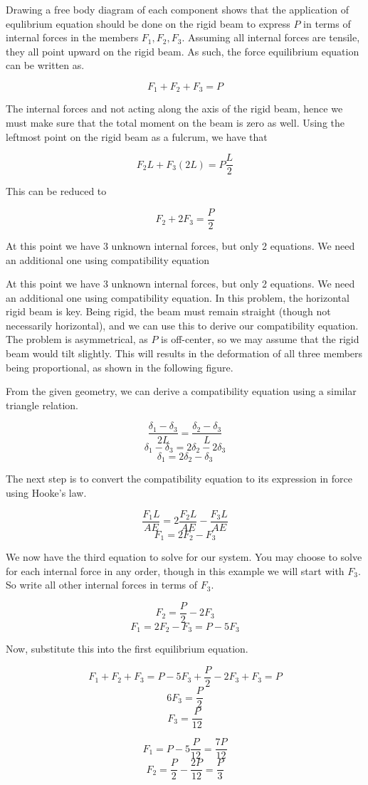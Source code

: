 \documentclass[
10pt,
a4paper,
openany,
svgnames,
]{kaobook} %
\begin{document}
\begin{solution}

  Drawing a free body diagram of each component shows that the application of equlibrium equation should be done on the rigid beam to express $P$ in terms of internal forces in the members $F_1, F_2, F_3$. Assuming all internal forces are tensile, they all point upward on the rigid beam. As such, the force equilibrium equation can be written as.

 \[ F_1 + F_2 + F_3 = P \]

 The internal forces and not acting along the axis of the rigid beam, hence we must make sure that the total moment on the beam is zero as well. Using the leftmost point on the rigid beam as a fulcrum, we have that

 $$ F_2 L + F_3 (2L) = P \frac{L}{2} $$

 This can be reduced to 

 $$ F_2 + 2F_3 = \frac{P}{2} $$

 At this point we have 3 unknown internal forces, but only 2 equations. We need an additional one using compatibility equation

 At this point we have 3 unknown internal forces, but only 2 equations. We need an additional one using compatibility equation. In this problem, the horizontal rigid beam is key. Being rigid, the beam must remain straight (though not necessarily horizontal), and we can use this to derive our compatibility equation. The problem is asymmetrical, as $P$ is off-center, so we may assume that the rigid beam would tilt slightly. This will results in the deformation of all three members being proportional, as shown in the following figure.


 From the given geometry, we can derive a compatibility equation using a similar triangle relation.

 $$ \frac{\delta_1 - \delta_3}{2L} = \frac{\delta_2 - \delta_3}{L} $$
 $$ \delta_1 - \delta_3 = 2\delta_2 - 2\delta_3 $$
 $$ \delta_1 = 2\delta_2 - \delta_3 $$

 The next step is to convert the compatibility equation to its expression in force using Hooke's law.

 $$ \frac{F_1 L}{AE} = 2\frac{F_2 L}{AE} - \frac{F_3 L}{AE} $$
 $$ F_1 = 2F_2 - F_3 $$

 We now have the third equation to solve for our system. You may choose to solve for each internal force in any order, though in this example we will start with $F_3$. So write all other internal forces in terms of $F_3$.

 $$ F_2 = \frac{P}{2} - 2F_3 $$
 $$ F_1 = 2F_2 - F_3 = P - 5F_3 $$

 Now, substitute this into the first equilibrium equation.

 $$ F_1 + F_2 + F_3 = P - 5F_3 + \frac{P}{2} - 2F_3 + F_3 = P $$
 $$ 6F_3 = \frac{P}{2} $$
 $$ F_3 = \frac{P}{12} $$

 $$ F_1 = P - 5 \frac{P}{12} = \frac{7P}{12} $$
 $$ F_2 = \frac{P}{2} - \frac{2P}{12} = \frac{P}{3} $$
\end{solution}
\end{document}
